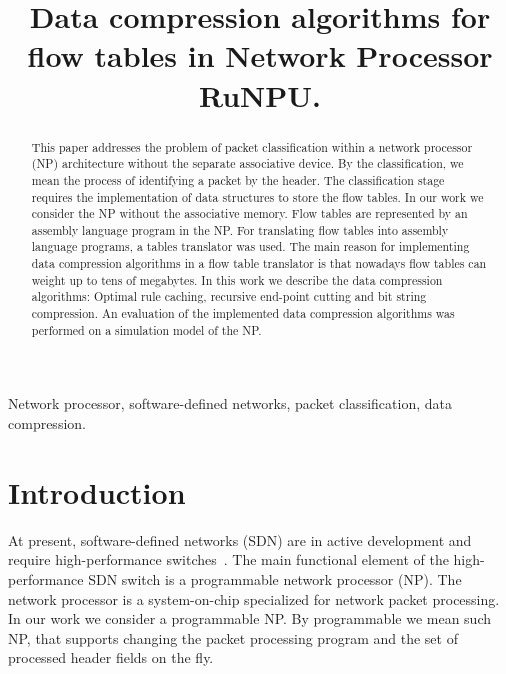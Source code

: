 \documentclass[conference]{IEEEtran}
\begin{document}
\author{
    \and
    }
\title{
    Data compression algorithms for flow tables in Network Processor RuNPU.
}
\maketitle
    \begin{abstract}
        This paper addresses the problem of packet classification within a network processor (NP) architecture 
        without the separate associative device.
        By the classification, we mean the process of identifying a packet by the header.
        The classification stage requires the implementation of data structures to store the flow tables.
        In our work we consider the NP without the associative memory. 
        Flow tables are represented by an assembly language program in the NP. For translating flow tables into assembly language programs,
        a tables translator was used. 
        The main reason for implementing data compression algorithms in a flow table translator is that nowadays 
        flow tables can weight up to tens of megabytes.
        In this work we describe the data compression algorithms: Optimal rule caching, recursive end-point cutting and
        bit string compression. An evaluation of the implemented data compression algorithms was performed on a 
        simulation model of the NP.
    \end{abstract}
    
    \begin{IEEEkeywords}
        Network processor, software-defined networks, packet classification, data compression.
    \end{IEEEkeywords}

    \section{Introduction}
        At present, software-defined networks (SDN) are in active development and require high-performance switches~\cite{smel2012open}.
        The main functional element of the high-performance SDN switch is a programmable network processor (NP).
        The network processor is a system-on-chip specialized for network packet processing. In our work we consider
        a programmable NP. By programmable we mean such NP, that supports changing the packet processing program 
        and the set of processed header fields on the fly. 
        
\end{document}
